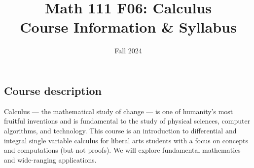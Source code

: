 \documentclass[11pt,twoside]{amsart}
\title{Math 111 F06: Calculus\\ Course Information \& Syllabus}
\author[Math 111 F06:  Calculus]{Fall 2024}
\begin{document}
\maketitle

\thispagestyle{empty}

\vspace{-.5cm}

\begin{center}
\end{center}

\smallskip

\subsection*{Course description}
Calculus --- the mathematical study of change --- is one of humanity's most fruitful inventions and is fundamental to the study of physical sciences, computer algorithms, and technology. This course is an introduction to differential and integral single variable calculus for liberal arts students with a focus on concepts and computations (but not proofs). We will explore fundamental mathematics and wide-ranging applications.
\end{document}
